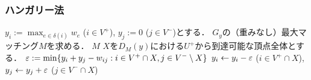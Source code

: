 \documentclass[14pt,aspectratio=169,xcolor=dvipsnames,table,onlytextwidth,dvipdfmx]{beamer}
\begin{document}
\begin{frame}
    \frametitle{ハンガリー法}
    
    \small
    \begin{block}{}
        \begin{algorithmic}[1]
            \STATE $y_i := \max_{e \in \delta(i)} w_e$ ($i \in V^+$), $y_j := 0$ ($j \in V^-$)とする．
                \STATE $G_y$の（重みなし）最大マッチング$M$を求める． 
                    \RETURN $M$ 
                \ELSE[{$w$被覆$y$を更新}]
                    \STATE $X$を$D_M(y)$における$U^+$から到達可能な頂点全体とする．
                    \STATE $\varepsilon := \min\{ y_i + y_j - w_{ij} : i \in V^+ \cap X, j \in V^- \setminus X \}$
                    \STATE $y_i \gets y_i - \varepsilon$ ($i \in V^+ \cap X$), $y_j \gets y_j + \varepsilon$ ($j \in V^- \cap X$)
                \ENDIF
            \ENDWHILE
        \end{algorithmic} 
    \end{block}
\end{frame}
\end{document}

